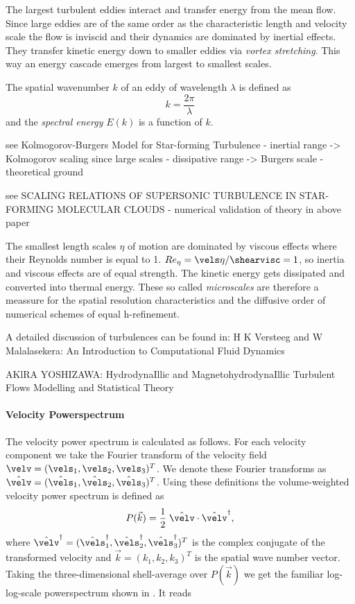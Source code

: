 The largest turbulent eddies interact and transfer energy from the mean flow.
Since large eddies are of the same order as the characteristic length and
velocity scale the flow is inviscid and their dynamics are dominated by
inertial effects. They transfer kinetic energy down to smaller eddies via
\emph{vortex stretching}. This way an energy cascade emerges from largest to
smallest scales.

The spatial wavenumber $k$ of an eddy of wavelength $\lambda$ is defined as
\begin{equation}
    k = \frac{2\pi}{\lambda}
\end{equation}
and the \emph{spectral energy} $E(k)$ is a function of $k$.

see Kolmogorov-Burgers Model for Star-forming Turbulence
    - inertial range -> Kolmogorov scaling since large scales
    - dissipative range -> Burgers scale
    - theoretical ground

see SCALING RELATIONS OF SUPERSONIC TURBULENCE IN STAR-FORMING MOLECULAR CLOUDS
    - numerical validation of theory in above paper




The smallest length scales $\eta$ of motion are dominated by viscous effects
where their Reynolds number is equal to 1. $Re_{\eta} = \vels \eta / \shearvisc = 1$,
so inertia and viscous effects are of equal strength. The kinetic energy
gets dissipated and converted into thermal energy. These so called
 \emph{microscales} are therefore a meassure for the spatial
resolution characteristics and the diffusive order of numerical schemes of equal
h-refinement.

A detailed discussion of turbulences can be found in:
H K Versteeg and W Malalasekera: An Introduction to Computational Fluid Dynamics

AKlRA YOSHIZAWA: HydrodynaIllic and MagnetohydrodynaIllic Turbulent Flows Modelling and
Statistical Theory

\paragraph{Velocity Powerspectrum}
The velocity power spectrum is calculated as follows. For each velocity
component we take the Fourier transform of the velocity field $\velv =
(\vels_1, \vels_2, \vels_3)^T$. We denote these Fourier transforms as
$\hat{\velv} = (\hat{\vels}_1, \hat{\vels}_2, \hat{\vels}_3)^T$. Using these
definitions the volume-weighted velocity power spectrum is defined as
\begin{equation}
    P(\vec{k}) = \frac{1}{2} \; \hat{\velv} \cdot \hat{\velv}^{\dagger},
\end{equation}
where $\hat{\velv}^{\dagger} = (\hat{\vels}_1^{\dagger},
\hat{\vels}_2^{\dagger}, \hat{\vels}_3^{\dagger})^T$ is the complex conjugate
of the transformed velocity and $\vec{k} = (k_1,k_2,k_3)^T$ is the spatial wave
number vector. Taking the three-dimensional shell-average over $P(\vec{k})$ we
get the familiar log-log-scale powerspectrum shown in
. It reads

